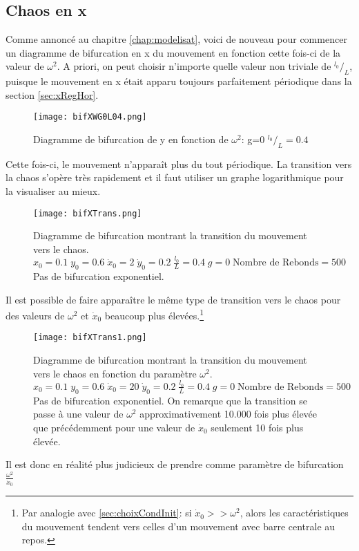 \documentclass[a4paper]{report}
\begin{document}
\subsection{Chaos en x}
Comme annoncé au chapitre \ref{chap:modelisat}, voici de nouveau pour commencer un diagramme de bifurcation en x du mouvement en fonction cette fois-ci de la valeur de \(\omega^2 \). A priori, on peut choisir n'importe quelle valeur non triviale de \(^{l_0}/_L\), puisque le mouvement en x était apparu toujours parfaitement périodique dans la section \ref{sec:xRegHor}.
\begin{figure}[h!]
   \texttt{[image: bifXWG0L04.png]}
      \caption[Diagramme de bifurcation de x en fonction de \(\omega ^2\): g=0, \(^{l_0}/_L=0.4\)]{Diagramme de bifurcation de y en fonction de \(\omega ^2\): g=0   \(^{l_0}/_L=0.4\)}
\end{figure}

Cette fois-ci, le mouvement n'apparaît plus du tout périodique. La transition vers la chaos s'opère très rapidement et il faut utiliser un graphe logarithmique pour la visualiser au mieux.
\begin{figure}[H]
   \texttt{[image: bifXTrans.png]}
      \caption[Transition du mouvement vers le chaos en fontion de \(\omega ^2 \): g=0]{Diagramme de bifurcation montrant la transition du mouvement vers le chaos.\\ \(x_0=0.1 \; y_0=0.6 \; \dot{x}_0=2 \; \dot{y}_0=0.2 \; \frac{l_0}{L}=0.4 \; g=0 \; \text{Nombre de Rebonds}=500\) Pas de bifurcation exponentiel.}
\end{figure}

Il est possible de faire apparaître le même type de transition vers le chaos pour des valeurs de \(\omega^2\) et \(\dot{x}_0\) beaucoup plus élevées.\footnote{Par analogie avec \ref{sec:choixCondInit}: si \(\dot{x}_0>>\omega ^2\), alors les caractéristiques du mouvement tendent vers celles d'un mouvement avec barre centrale au repos.}
\begin{figure}[H]
   \texttt{[image: bifXTrans1.png]}
      \caption[Transition du mouvement vers le chaos pour une vitesse de départ en x plus élevée]{Diagramme de bifurcation montrant la transition du mouvement vers le chaos en fonction du paramètre \( \omega ^2 \).\\ \(x_0=0.1 \; y_0=0.6 \; \dot{x}_0=20 \; \dot{y}_0=0.2 \; \frac{l_0}{L}=0.4 \; g=0 \; \text{Nombre de Rebonds}=500\) Pas de bifurcation exponentiel. On remarque que la transition se passe à une valeur de \(\omega ^2\) approximativement 10.000 fois plus élevée que précédemment pour une valeur de \(\dot{x}_0\) seulement 10 fois plus élevée. }
\end{figure}
Il est donc en réalité plus judicieux de prendre comme paramètre de bifurcation \( \frac{ \omega ^2 }{\dot{x}_0}\)
\end{document}
